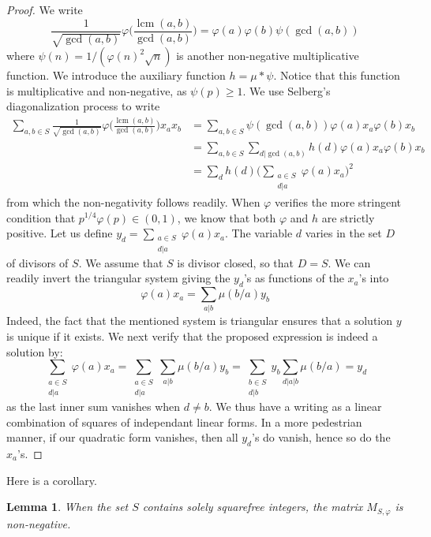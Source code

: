 \documentclass[a4paper,12pt, reqn0]{amsart}
\newtheorem{lemma}{Lemma}[section]
\theoremstyle{remark}
\DeclareMathOperator{\lcm}{lcm}
\begin{document}
\begin{proof}
  We write
  \begin{equation*}
  \frac{1}{\sqrt{\gcd(a,b)}}
    \varphi\biggl(\frac{\lcm(a,b)}{\gcd(a,b)}\biggr)
    =\varphi(a)\varphi(b)\psi(\gcd(a,b))
  \end{equation*}
  where $\psi(n)=1/(\varphi(n)^2\sqrt{n})$ 
  is another non-negative multiplicative
  function. We introduce the auxiliary function $h=\mu\ast
  \psi$. Notice that this function is multiplicative and
  non-negative, as $\psi(p)\ge 1$. We use Selberg's diagonalization
  process  to write
  \begin{align*}
    \sum_{a,b\in S}
    \frac{1}{\sqrt{\gcd(a,b)}}
    \varphi\biggl(\frac{\lcm(a,b)}{\gcd(a,b)}\biggr)x_ax_b
    &=
      \sum_{a,b\in S}
      \psi(\gcd(a,b)) \varphi(a)x_a\varphi(b)x_b
     \\& =\sum_{a,b\in S}
      \sum_{d|\gcd(a,b)}h(d)\varphi(a)x_a\varphi(b)x_b\\
    &=
    \sum_{d} h(d)\biggl(\sum_{\substack{a\in S\\ d|a}}\varphi(a)x_a\biggr)^2
  \end{align*}
  from which the non-negativity follows readily. When $\varphi$ verifies
  the more stringent condition that $p^{1/4}\varphi(p)\in(0,1)$, we know that both
  $\varphi$ and $h$ are strictly positive. Let us define
  $y_d=\sum_{\substack{a\in S\\ d|a}}\varphi(a)x_a$. The variable $d$ varies
  in the set $D$ of divisors of $S$. We assume that $S$ is divisor
  closed, so that $D=S$. We can readily invert
  the triangular system giving the $y_d$'s as functions of the $x_a$'s into
  \begin{equation*}
    \varphi(a)x_a=\sum_{a|b}\mu(b/a)y_b
  \end{equation*}
  Indeed, the fact that the mentioned system is triangular ensures
  that a solution $y$ is unique if it exists. We next verify that the proposed expression
  is indeed a solution by:
  \begin{equation*}
    \sum_{\substack{a\in S\\ d|a}}\varphi(a)x_a
    =\sum_{\substack{a\in S\\ d|a}}\sum_{a|b}\mu(b/a)y_b
    =\sum_{\substack{b\in S\\ d|b}}y_b\sum_{d|a|b}\mu(b/a)=y_d
  \end{equation*}
  as the last inner sum vanishes when $d\neq b$. We thus have a
  writing as a linear combination of squares of independant linear
  forms. In a more pedestrian manner, if our quadratic form vanishes,
  then all $y_d$'s do vanish, hence so do the $x_a$'s.
\end{proof}
Here is a corollary.
\begin{lemma}
  \label{CMb}
  When the set $S$ contains solely squarefree integers, the matrix
  $M_{S,\varphi}$ is non-negative.
\end{lemma}
\end{document}
